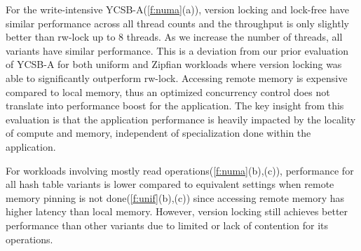 For the write-intensive YCSB-A(\autoref{f:numa}(a)), version locking and lock-free
have similar performance across all thread counts and the throughput is only 
slightly better than rw-lock up to 8 threads. As we increase the number of threads,
all variants have similar performance. This is a deviation from our prior evaluation
of YCSB-A for both uniform and Zipfian workloads where version locking was able to
significantly outperform rw-lock. Accessing remote memory is expensive compared to
local memory, thus an optimized concurrency control does not translate into 
performance boost for the application. The key insight from this evaluation is that
the application performance is heavily impacted by the locality of compute and memory,
independent of specialization done within the application.

For workloads involving mostly read operations(\autoref{f:numa}(b),(c)), performance
for all hash table variants is lower compared to equivalent settings when remote
memory pinning is not done(\autoref{f:unif}(b),(c)) since accessing remote memory
has higher latency than local memory. However, version locking still achieves
better performance than other variants due to limited or lack of contention for its
operations.


